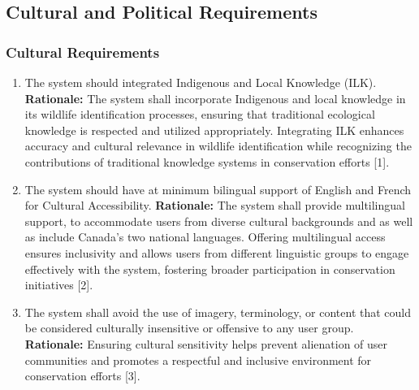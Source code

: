 \documentclass[]{article}
\begin{document}

\subsection{Cultural and Political Requirements}
\label{sub:cultural_and_political_requirements}

\subsubsection{Cultural Requirements}
\label{ssub:cultural_requirements}
\begin{enumerate}[{CP-C}1. ]
	\item The system should integrated Indigenous and Local Knowledge (ILK).
    \newline \textbf{Rationale:} The system shall incorporate Indigenous and local knowledge in its wildlife identification processes, ensuring that traditional ecological knowledge is respected and utilized appropriately. Integrating ILK enhances accuracy and cultural relevance in wildlife identification while recognizing the contributions of traditional knowledge systems in conservation efforts [1].

     \item The system should have at minimum bilingual support of English and French for Cultural Accessibility.
    \newline\textbf{Rationale:} The system shall provide multilingual support, to accommodate users from diverse cultural backgrounds and as well as include Canada's two national languages. Offering multilingual access ensures inclusivity and allows users from different linguistic groups to engage effectively with the system, fostering broader participation in conservation initiatives [2].
\item The system shall avoid the use of imagery, terminology, or content that could be considered culturally insensitive or offensive to any user group.
    \newline\textbf{Rationale:}  Ensuring cultural sensitivity helps prevent alienation of user communities and promotes a respectful and inclusive environment for conservation efforts [3].
\end{enumerate}
\end{document}
